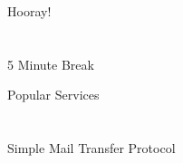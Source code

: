 \documentclass[xga]{xdvislides}
\begin{document}
%
%
\newpage
\vspace*{\fill}
\begin{center}
    \Hugesize
        Hooray! \\ [1em]
    \hspace*{5mm}
    \blueline\\
    \hspace*{5mm}\\
        5 Minute Break
\end{center}
\vspace*{\fill}

\newpage
\vspace*{\fill}
\begin{center}
	\Hugesize
		Popular Services \\ [1em]
	\hspace*{5mm}
	\blueline\\
	\hspace*{5mm}\\
		Simple Mail Transfer Protocol
\end{center}
\vspace*{\fill}
\end{document}

